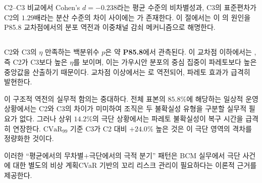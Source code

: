 

\section{}
\label{sec:ch5_dual_channel}

C2--C3 비교에서 Cohen's $d = -0.238$라는 평균 수준의 비차별성과,
C3의 표준편차가 C2의 $1.29$배라는 분산 수준의 차이 사이에는
가 존재한다. 이 절에서는 이 의 원인을 P85.8 교차점에서의
분포 역전과 이중채널 감쇠 메커니즘으로 해명한다.


\subsection{}
\label{subsec:ch5_crossover}

C2와 C3의 $\eta$ 
만족하는 백분위수 $p$\chg{)}은 약 \textbf{P85.8}에서 관측된다.
이 교차점 이하에서는 , 즉 C2가 C3보다
높은 $\eta$를 보이며, 이는 가우시안 분포의 중심 집중이 파레토보다
높은 중앙값을 산출하기 때문이다.
교차점 이상에서는 로 역전되어,
파레토 효과가 급격히 발현한다.

이 구조적 역전의 실무적 함의는 중대하다.
전체 표본의 $85.8\%$에 해당하는 일상적 운영 상황에서는 C2와 C3의 차이가 미미하여
조직은 두 불확실성 유형을 구분할 실무적 필요가 없다.
그러나 상위 $14.2\%$의 극단 상황에서는 파레토 불확실성이 복구 시간을
급격히 연장한다. $\mathrm{CVaR}_{99}$ 기준 C3가 C2 대비 $+24.0\%$ 높은 것은
이 극단 영역의 격차를 정량화한 것이다.

이러한 ``평균에서의 무차별$+$극단에서의 극적 분기'' 패턴은
BCM 실무에서 극단 사건에 대한 별도의 비상 계획\chg{(}CVaR 기반의
꼬리 리스크 관리\chg{)}이 필요하다는 이론적 근거를 제공한다.


\subsection{}
\label{subsec:ch5_split_regression}

